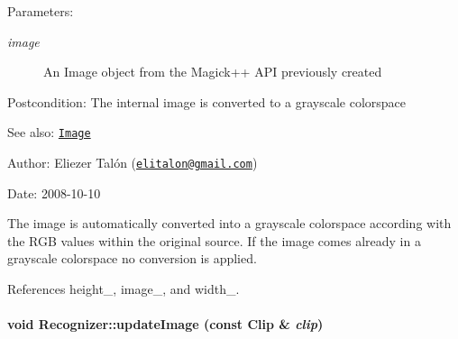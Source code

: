 \begin{Desc}
\item[Parameters:]
\begin{description}
\item[{\em image}]An Image object from the Magick++ API previously created\end{description}
\end{Desc}
\begin{Desc}
\item[Postcondition:]The internal image is converted to a grayscale colorspace\end{Desc}
\begin{Desc}
\item[See also:]\href{http://www.imagemagick.org/Magick++/Image.html}{\tt Image}\end{Desc}
\begin{Desc}
\item[Author:]Eliezer Talón (\href{mailto:elitalon@gmail.com}{\tt elitalon@gmail.com}) \end{Desc}
\begin{Desc}
\item[Date:]2008-10-10\end{Desc}
The image is automatically converted into a grayscale colorspace according with the RGB values within the original source. If the image comes already in a grayscale colorspace no conversion is applied. 

References height\_\-, image\_\-, and width\_\-.\hypertarget{class_recognizer_0779d8bb035f7d51cb26fdc3d410e019}{
\paragraph[updateImage]{\setlength{\rightskip}{0pt plus 5cm}void Recognizer::updateImage (const {\bf Clip} \& {\em clip})}\hfill}
\label{class_recognizer_0779d8bb035f7d51cb26fdc3d410e019}


